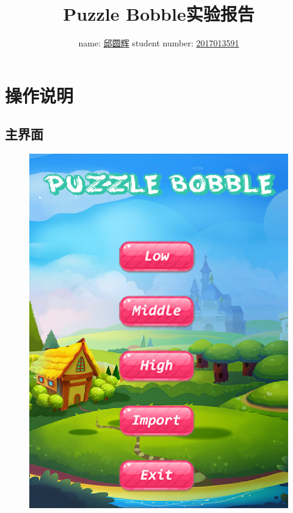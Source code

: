 \documentclass{article}
\begin{document}
    \title{Puzzle Bobble实验报告}
    \author{name: \underline{邱圆辉} \qquad student number: \underline{2017013591}}
    \date{}
    \maketitle

    \section{操作说明}
        \subsection{主界面}
        \begin{figure}[H]
            \centering
            \includegraphics[scale=0.5]{mainScene.png}
        \end{figure}
\end{document}

